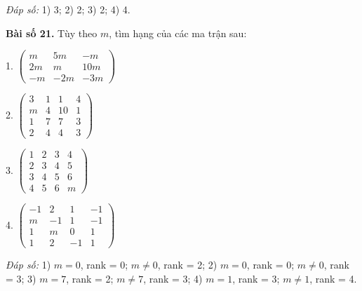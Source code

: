         
        \textit{Đáp số:}
        1) 3;
        2) 2;
        3) 2;
        4) 4.
        
        \textbf{Bài số 21.} Tùy theo \(m\), tìm hạng của các ma trận sau:
        
        1.
        \(
        \begin{pmatrix}
        m & 5m & -m \\
        2m & m & 10m \\
        -m & -2m & -3m
        \end{pmatrix}
        \)\\
        \vspace*{0.5cm}

        
        2.
        \(
        \begin{pmatrix}
        3 & 1 & 1 & 4 \\
        m & 4 & 10 & 1 \\
        1 & 7 & 7 & 3 \\
        2 & 4 & 4 & 3
        \end{pmatrix}
        \)\\
        \vspace*{0.5cm}

        
        3.
        \(
        \begin{pmatrix}
        1 & 2 & 3 & 4 \\
        2 & 3 & 4 & 5 \\
        3 & 4 & 5 & 6 \\
        4 & 5 & 6 & m
        \end{pmatrix}
        \)\\
        \vspace*{0.5cm}

        
        4.
        \(
        \begin{pmatrix}
        -1 & 2 & 1 & -1 \\
        m & -1 & 1 & -1 \\
        1 & m & 0 & 1 \\
        1 & 2 & -1 & 1
        \end{pmatrix}
        \)\\
        \vspace*{0.5cm}

        
        \textit{Đáp số:}
        1) \(m = 0\), rank = 0; \(m \neq 0\), rank = 2;
        2) \(m = 0\), rank = 0; \(m \neq 0\), rank = 3;
        3) \(m = 7\), rank = 2; \(m \neq 7\), rank = 3;
        4) \(m = 1\), rank = 3; \(m \neq 1\), rank = 4.
        
